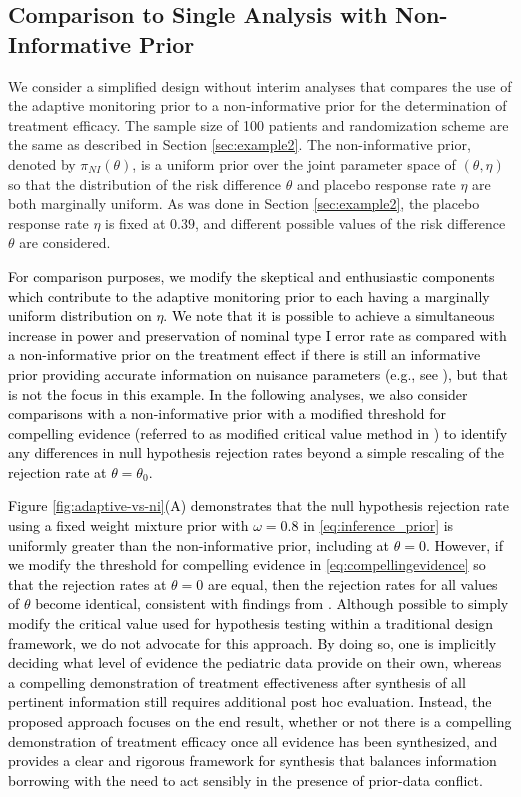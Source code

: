 \documentclass[12pt]{article}
\begin{document}
\begin{mdframed}[hidealllines=true,backgroundcolor=yellow]
\subsection{Comparison to Single Analysis with Non-Informative Prior}\label{sec:non-informative}
We consider a simplified design without interim analyses that compares the use of the adaptive monitoring prior to a non-informative prior for the determination of treatment efficacy. The sample size of 100 patients and randomization scheme are the same as described in Section \ref{sec:example2}. The non-informative prior, denoted by $\pi_{NI}(\theta)$, is a uniform prior over the joint parameter space of $(\theta,\eta)$ so that the distribution of the risk difference $\theta$ and placebo response rate $\eta$ are both marginally uniform. As was done in Section \ref{sec:example2}, the placebo response rate $\eta$ is fixed at $0.39$, and different possible values of the risk difference $\theta$ are considered.

\textcolor{black}{For comparison purposes, we modify the skeptical and enthusiastic components which contribute to the adaptive monitoring prior to each having a marginally uniform distribution on $\eta$. We note that it is possible to achieve a simultaneous increase in power and preservation of nominal type I error rate as compared with a non-informative prior on the treatment effect if there is still an informative prior providing accurate information on nuisance parameters (e.g., see \cite{Psioda2018a}), but that is not the focus in this example. In the following analyses, we also consider comparisons with a non-informative prior with a modified threshold for compelling evidence (referred to as modified critical value method in \cite{Psioda2018}) to identify any differences in null hypothesis rejection rates beyond a simple rescaling of the rejection rate at $\theta=\theta_0$.}

\textcolor{black}{Figure \ref{fig:adaptive-vs-ni}(A) demonstrates that the null hypothesis rejection rate using a fixed weight mixture prior with $\omega=0.8$ in \eqref{eq:inference_prior} is uniformly greater than the non-informative prior, including at $\theta=0$. However, if we modify the threshold for compelling evidence in \eqref{eq:compellingevidence} so that the rejection rates at $\theta=0$ are equal, then the rejection rates for all values of $\theta$ become identical, consistent with findings from \cite{Psioda2018}. Although possible to simply modify the critical value used for hypothesis testing within a traditional design framework, we do not advocate for this approach. By doing so, one is implicitly deciding what level of evidence the pediatric data provide on their own, whereas a compelling demonstration of treatment effectiveness after synthesis of all pertinent information still requires additional post hoc evaluation. Instead, the proposed approach focuses on the end result, whether or not there is a compelling demonstration of treatment efficacy once all evidence has been synthesized, and provides a clear and rigorous framework for synthesis that balances information borrowing with the need to act sensibly in the presence of prior-data conflict.}


\end{mdframed}
\end{document}
